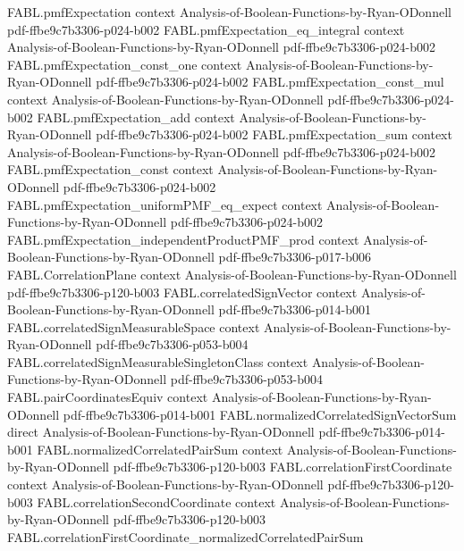 \begin{theorem}
\proofstep
  {FABL.pmfExpectation}
  {context}
  {Analysis-of-Boolean-Functions-by-Ryan-ODonnell}
  {pdf-ffbe9c7b3306-p024-b002}
\proofstep
  {FABL.pmfExpectation_eq_integral}
  {context}
  {Analysis-of-Boolean-Functions-by-Ryan-ODonnell}
  {pdf-ffbe9c7b3306-p024-b002}
\proofstep
  {FABL.pmfExpectation_const_one}
  {context}
  {Analysis-of-Boolean-Functions-by-Ryan-ODonnell}
  {pdf-ffbe9c7b3306-p024-b002}
\proofstep
  {FABL.pmfExpectation_const_mul}
  {context}
  {Analysis-of-Boolean-Functions-by-Ryan-ODonnell}
  {pdf-ffbe9c7b3306-p024-b002}
\proofstep
  {FABL.pmfExpectation_add}
  {context}
  {Analysis-of-Boolean-Functions-by-Ryan-ODonnell}
  {pdf-ffbe9c7b3306-p024-b002}
\proofstep
  {FABL.pmfExpectation_sum}
  {context}
  {Analysis-of-Boolean-Functions-by-Ryan-ODonnell}
  {pdf-ffbe9c7b3306-p024-b002}
\proofstep
  {FABL.pmfExpectation_const}
  {context}
  {Analysis-of-Boolean-Functions-by-Ryan-ODonnell}
  {pdf-ffbe9c7b3306-p024-b002}
\proofstep
  {FABL.pmfExpectation_uniformPMF_eq_expect}
  {context}
  {Analysis-of-Boolean-Functions-by-Ryan-ODonnell}
  {pdf-ffbe9c7b3306-p024-b002}
\proofstep
  {FABL.pmfExpectation_independentProductPMF_prod}
  {context}
  {Analysis-of-Boolean-Functions-by-Ryan-ODonnell}
  {pdf-ffbe9c7b3306-p017-b006}
\proofstep
  {FABL.CorrelationPlane}
  {context}
  {Analysis-of-Boolean-Functions-by-Ryan-ODonnell}
  {pdf-ffbe9c7b3306-p120-b003}
\proofstep
  {FABL.correlatedSignVector}
  {context}
  {Analysis-of-Boolean-Functions-by-Ryan-ODonnell}
  {pdf-ffbe9c7b3306-p014-b001}
\proofstep
  {FABL.correlatedSignMeasurableSpace}
  {context}
  {Analysis-of-Boolean-Functions-by-Ryan-ODonnell}
  {pdf-ffbe9c7b3306-p053-b004}
\proofstep
  {FABL.correlatedSignMeasurableSingletonClass}
  {context}
  {Analysis-of-Boolean-Functions-by-Ryan-ODonnell}
  {pdf-ffbe9c7b3306-p053-b004}
\proofstep
  {FABL.pairCoordinatesEquiv}
  {context}
  {Analysis-of-Boolean-Functions-by-Ryan-ODonnell}
  {pdf-ffbe9c7b3306-p014-b001}
\proofstep
  {FABL.normalizedCorrelatedSignVectorSum}
  {direct}
  {Analysis-of-Boolean-Functions-by-Ryan-ODonnell}
  {pdf-ffbe9c7b3306-p014-b001}
\proofstep
  {FABL.normalizedCorrelatedPairSum}
  {context}
  {Analysis-of-Boolean-Functions-by-Ryan-ODonnell}
  {pdf-ffbe9c7b3306-p120-b003}
\proofstep
  {FABL.correlationFirstCoordinate}
  {context}
  {Analysis-of-Boolean-Functions-by-Ryan-ODonnell}
  {pdf-ffbe9c7b3306-p120-b003}
\proofstep
  {FABL.correlationSecondCoordinate}
  {context}
  {Analysis-of-Boolean-Functions-by-Ryan-ODonnell}
  {pdf-ffbe9c7b3306-p120-b003}
\proofstep
  {FABL.correlationFirstCoordinate_normalizedCorrelatedPairSum}

\end{theorem}

